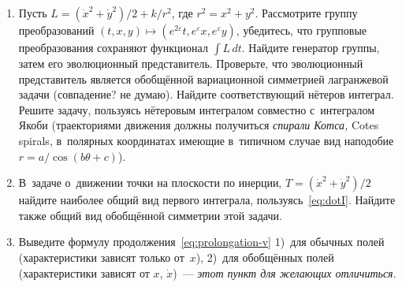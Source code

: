 \documentclass[a4paper,11pt]{article}
\newcommand\slashfrac[2]{{#1/#2}}
\theoremstyle{definition}
\begin{document}
\begin{enumerate}
\item
Пусть $L=\slashfrac{(\dot x^2+\dot y^2)}2+\slashfrac k{r^2}$, где
$r^2=x^2+y^2$. Рассмотрите группу преобразований
$(t,x,y)\mapsto(e^{2\varepsilon}t,e^\varepsilon x,e^\varepsilon y)$, убедитесь,
что групповые преобразования сохраняют функционал $\int L\,dt$. Найдите
генератор группы, затем его эволюционный представитель. Проверьте, что
эволюционный представитель является обобщённой вариационной симметрией
лагранжевой задачи (совпадение? не думаю). Найдите соответствующий нётеров
интеграл. Решите задачу, пользуясь нётеровым интегралом совместно с~интегралом
Якоби (траекториями движения должны получиться \emph{спирали Котса,} Cotes
spirals, в~полярных координатах имеющие в~типичном случае вид наподобие
$r=\slashfrac a{{\cos(b\theta+c)}}$).

\item
В~задаче о~движении точки на плоскости по инерции, $T=\slashfrac{(\dot x^2+\dot
y^2)}2$ найдите наиболее общий вид первого интеграла,
пользуясь~\eqref{eq:dotI}. Найдите также общий вид обобщённой симметрии этой
задачи.

\item
Выведите формулу продолжения~\eqref{eq:prolongation-v} 1)~для обычных полей
(характеристики зависят только от~$x$), 2)~для обобщённых полей (характеристики
зависят от $x$, $\dot x$)~— \emph{этот пункт для желающих отличиться}.

\end{enumerate}
\end{document}
